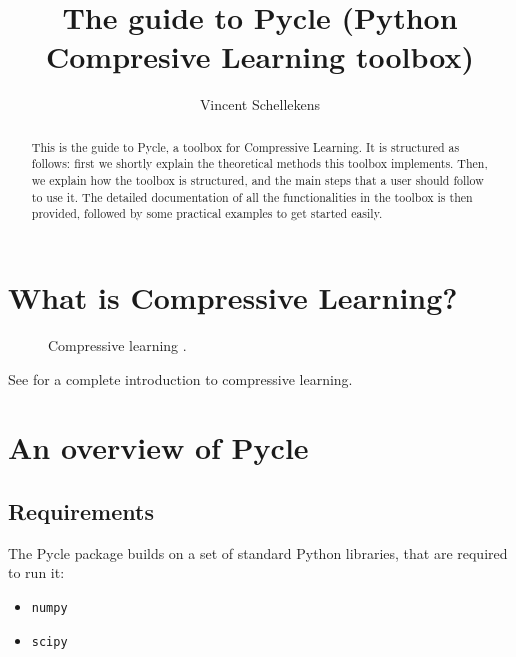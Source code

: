 \documentclass[]{article}
\title{The guide to Pycle (\textbf{Py}thon \textbf{C}ompresive \textbf{Le}arning toolbox)}
\author{Vincent Schellekens}
\newcommand{\code}{\texttt}
\renewcommand{\Vec}[1]{\bm{#1}} %
\begin{document}

\maketitle

\begin{abstract}
	This is the guide to Pycle, a toolbox for Compressive Learning. It is structured as follows: first we shortly explain the theoretical methods this toolbox implements. Then, we explain how the toolbox is structured, and the main steps that a user should follow to use it. The detailed documentation of all the functionalities in the toolbox is then provided, followed by some practical examples to get started easily.
\end{abstract}


\section{What is Compressive Learning?}

		
\begin{figure}[!htb]
	\centering
	\caption{Compressive learning .}
	\label{fig:CL}
	\end {figure}


See \cite{gribonval2017compressive} for a complete introduction to compressive learning.

\section{An overview of Pycle}


\subsection{Requirements}
The Pycle package builds on a set of standard Python libraries, that are required to run it:
\begin{itemize}
	\item \code{numpy}
	\item \code{scipy}
\end{itemize}
\end{document}
